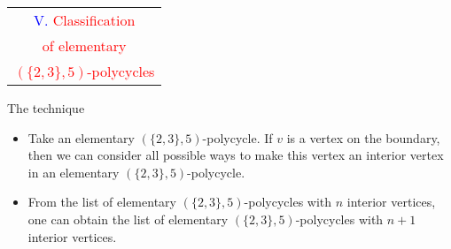 \documentclass[%
pdf,
colorBG,
slideColor,
]{prosper}
\begin{document}
\begin{slide}{}
\begin{center}
{\Huge 
\begin{tabular*}{8cm}{c}
\\[-0.5cm]
\textcolor{blue}{V. }\textcolor{red}{Classification}\\
\textcolor{red}{of elementary}\\
\textcolor{red}{$(\{2,3\},5)$-polycycles}
\end{tabular*}
}
\end{center}
\end{slide}



\begin{slide}{The technique}
\begin{itemize}
\item Take an elementary $(\{2,3\},5)$-polycycle. If $v$ is a vertex on the boundary, then we can consider all possible ways to make this vertex an interior vertex in an elementary $(\{2,3\}, 5)$-polycycle.
\item From the list of elementary $(\{2,3\}, 5)$-polycycles with $n$ interior vertices, one can obtain the list of elementary $(\{2,3\}, 5)$-polycycles with $n+1$ interior vertices.
\begin{center}
\par
\end{center}
\end{itemize}
\end{slide}
\end{document}
